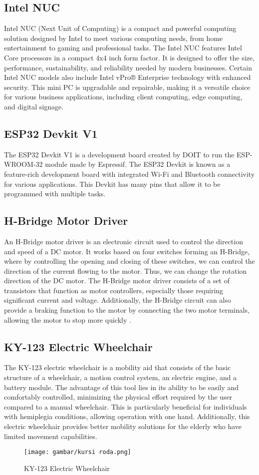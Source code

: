 \subsection{Intel NUC}
Intel NUC (Next Unit of Computing) is a compact and powerful computing solution designed by Intel to meet various computing needs, from home entertainment to gaming and professional tasks. The Intel NUC features Intel Core processors in a compact 4x4 inch form factor. It is designed to offer the size, performance, sustainability, and reliability needed by modern businesses. Certain Intel NUC models also include Intel vPro® Enterprise technology with enhanced security. This mini PC is upgradable and repairable, making it a versatile choice for various business applications, including client computing, edge computing, and digital signage.

\subsection{ESP32 Devkit V1}

The ESP32 Devkit V1 is a development board created by DOIT to run the ESP-WROOM-32 module made by Espressif. The ESP32 Devkit is known as a feature-rich development board with integrated Wi-Fi and Bluetooth connectivity for various applications. This Devkit has many pins that allow it to be programmed with multiple tasks.

\subsection{H-Bridge Motor Driver}

An H-Bridge motor driver is an electronic circuit used to control the direction and speed of a DC motor. It works based on four switches forming an H-Bridge, where by controlling the opening and closing of these switches, we can control the direction of the current flowing to the motor. Thus, we can change the rotation direction of the DC motor. The H-Bridge motor driver consists of a set of transistors that function as motor controllers, especially those requiring significant current and voltage. Additionally, the H-Bridge circuit can also provide a braking function to the motor by connecting the two motor terminals, allowing the motor to stop more quickly \cite{fibrianianalisis}.

\subsection{KY-123 Electric Wheelchair}
The KY-123 electric wheelchair is a mobility aid that consists of the basic structure of a wheelchair, a motion control system, an electric engine, and a battery module. The advantage of this tool lies in its ability to be easily and comfortably controlled, minimizing the physical effort required by the user compared to a manual wheelchair. This is particularly beneficial for individuals with hemiplegia conditions, allowing operation with one hand. Additionally, this electric wheelchair provides better mobility solutions for the elderly who have limited movement capabilities.

\begin{figure}[H]
  \centering

  \texttt{[image: gambar/kursi roda.png]}

  \caption{KY-123 Electric Wheelchair}
  \label{fig:roketluarangkasa}
\end{figure}
